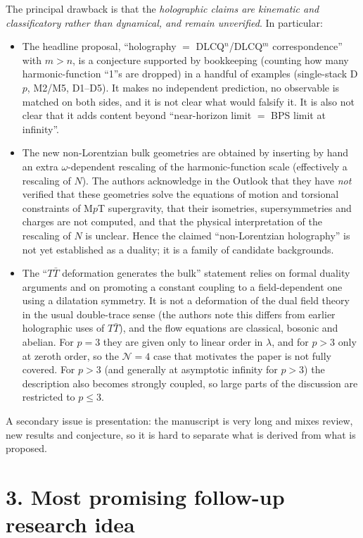 \documentclass[11pt]{article}
\newcommand{\TT}{T\bar T}
\begin{document}
The principal drawback is that the \emph{holographic claims are kinematic and classificatory rather than dynamical, and remain unverified}. In particular:
\begin{itemize}[nosep]
\item The headline proposal, ``holography $=$ DLCQ$^n$/DLCQ$^m$ correspondence'' with $m>n$, is a conjecture supported by bookkeeping (counting how many harmonic-function ``1''s are dropped) in a handful of examples (single-stack D$p$, M2/M5, D1--D5). It makes no independent prediction, no observable is matched on both sides, and it is not clear what would falsify it. It is also not clear that it adds content beyond ``near-horizon limit $=$ BPS limit at infinity''.
\item The new non-Lorentzian bulk geometries are obtained by inserting by hand an extra $\omega$-dependent rescaling of the harmonic-function scale (effectively a rescaling of $N$). The authors acknowledge in the Outlook that they have \emph{not} verified that these geometries solve the equations of motion and torsional constraints of M$p$T supergravity, that their isometries, supersymmetries and charges are not computed, and that the physical interpretation of the rescaling of $N$ is unclear. Hence the claimed ``non-Lorentzian holography'' is not yet established as a duality; it is a family of candidate backgrounds.
\item The ``$\TT$ deformation generates the bulk'' statement relies on formal duality arguments and on promoting a constant coupling to a field-dependent one using a dilatation symmetry. It is not a deformation of the dual field theory in the usual double-trace sense (the authors note this differs from earlier holographic uses of $\TT$), and the flow equations are classical, bosonic and abelian. For $p=3$ they are given only to linear order in $\lambda$, and for $p>3$ only at zeroth order, so the $\mathcal N=4$ case that motivates the paper is not fully covered. For $p>3$ (and generally at asymptotic infinity for $p>3$) the description also becomes strongly coupled, so large parts of the discussion are restricted to $p\le 3$.
\end{itemize}
A secondary issue is presentation: the manuscript is very long and mixes review, new results and conjecture, so it is hard to separate what is derived from what is proposed.

\section*{3. Most promising follow-up research idea}
\end{document}
